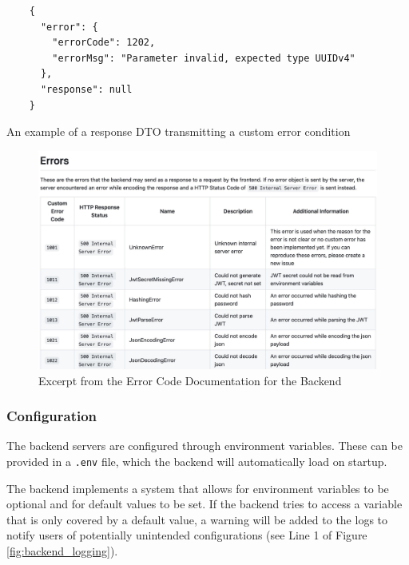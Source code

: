 \begin{listing}[htbp]
  \centering{}
  \begin{minipage}{0.7\textwidth}
  \begin{verbatim}
    {
      "error": {
        "errorCode": 1202,
        "errorMsg": "Parameter invalid, expected type UUIDv4"
      },
      "response": null
    }
  \end{verbatim}
  \end{minipage}
  \caption{An example of a response DTO transmitting a custom error condition}
  \label{listing:response_dto_error}
\end{listing}

\begin{figure}[htbp]
  \centering{}
  \includegraphics[width=\textwidth]{images/errors_documentation.jpg}
  \caption{Excerpt from the Error Code Documentation for the Backend}
  \label{fig:error_code_documentation}
\end{figure}

\subsubsection{Configuration}
The backend servers are configured through environment variables. These can be
provided in a \texttt{.env} file, which the backend will automatically load on
startup.

The backend implements a system that allows for environment variables to be
optional and for default values to be set. If the backend tries to access a
variable that is only covered by a default value, a warning will be added to the
logs to notify users of potentially unintended configurations (see Line 1 of
Figure \ref{fig:backend_logging}).

